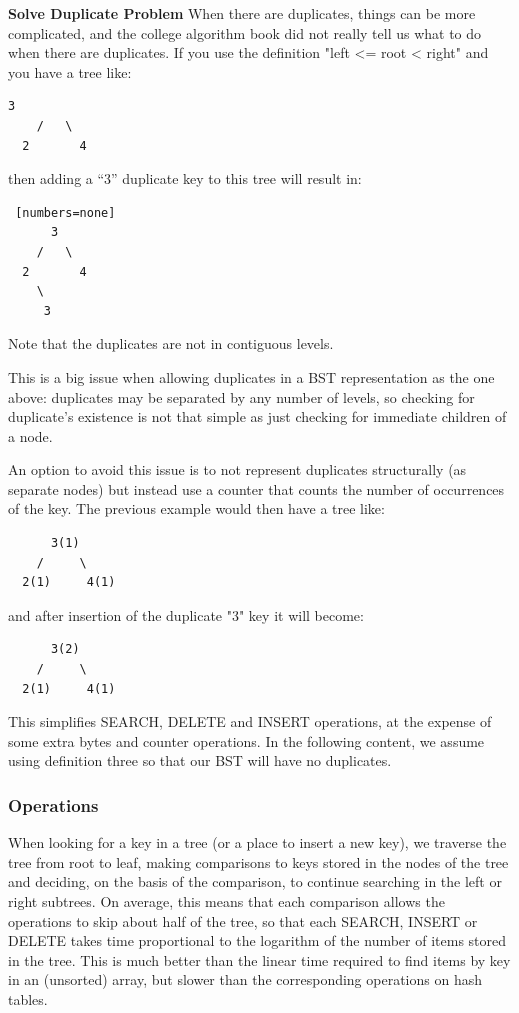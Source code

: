 \documentclass[data-structure.tex]{subfiles}
\begin{document}
\textbf{Solve Duplicate Problem} When there are duplicates, things can be more complicated, and the college algorithm book did not really tell us what to do when there are duplicates.  If you use the definition "left <= root < right" and you have a tree like:
\begin{lstlisting}[numbers=none]
      3
    /   \
  2       4
\end{lstlisting}

then adding a ``3'' duplicate key to this tree will result in:
\begin{lstlisting} [numbers=none]
      3
    /   \
  2       4
    \
     3
\end{lstlisting}
Note that the duplicates are not in contiguous levels.

This is a big issue when allowing duplicates in a BST representation as the one above: duplicates may be separated by any number of levels, so checking for duplicate's existence is not that simple as just checking for immediate children of a node.

An option to avoid this issue is to not represent duplicates structurally (as separate nodes) but instead use a counter that counts the number of occurrences of the key. The previous example would then have a tree like:
\begin{lstlisting}
      3(1)
    /     \
  2(1)     4(1)
  \end{lstlisting}

and after insertion of the duplicate "3" key it will become:
\begin{lstlisting}
      3(2)
    /     \
  2(1)     4(1)
  \end{lstlisting}

This simplifies SEARCH, DELETE and INSERT operations, at the expense of some extra bytes and counter operations. In the following content, we assume using definition three so that our BST will have no duplicates. 

\subsubsection{Operations}
When looking for a key in a tree (or a place to insert a new key), we traverse the tree from root to leaf, making comparisons to keys stored in the nodes of the tree and deciding, on the basis of the comparison, to continue searching in the left or right subtrees. On average, this means that each comparison allows the operations to skip about half of the tree, so that each SEARCH, INSERT or DELETE takes time proportional to the logarithm of the number of items stored in the tree. This is much better than the linear time required to find items by key in an (unsorted) array, but slower than the corresponding operations on hash tables. 
\end{document}

